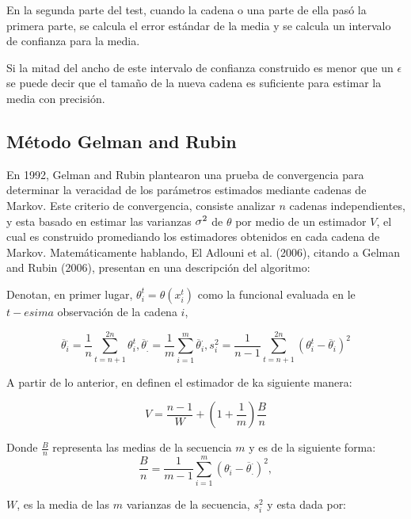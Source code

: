 En la segunda parte del test, cuando la cadena o una parte de ella pasó la primera parte, se calcula el error estándar de la media y se calcula un intervalo de confianza para la media. 

Si la mitad del ancho de este intervalo de confianza construido es menor que un $\epsilon$ se puede decir que el tamaño de la nueva cadena es suficiente para estimar la media con precisión. \cite{romo}

\subsection{Método Gelman and Rubin}

En 1992, Gelman and Rubin plantearon una prueba de convergencia para determinar la veracidad de los parámetros estimados mediante cadenas de Markov. Este criterio de convergencia, consiste analizar $n$ cadenas independientes, 
y esta basado en estimar las varianzas $\sigma ^2 $ de $\theta$ por medio de un estimador $V$, el cual es construido promediando los estimadores obtenidos en cada cadena de Markov. Matemáticamente hablando, El Adlouni et al. (2006), citando a Gelman and Rubin (2006), presentan en \cite{adlouni} una descripción del algoritmo: 

Denotan, en primer lugar, $\theta_i^t=\theta(x_i^t)$ como la funcional evaluada en le $t-esima$ observación de la cadena $i$,

\begin{equation}
\overline{\theta}_i^{.}=\frac{1}{n}\sum_{t=n+1}^{2n} \theta_i^t , \overline{\theta}_{.}^{.}=\frac{1}{m} \sum_{i=1}^m \overline{\theta}_i^{.}, s_i^2=\frac{1}{n-1} \sum_{t=n+1}^{2n}(\theta_i^t-\overline{\theta}_i^{.})^2
\end{equation}

A partir de lo anterior, en \cite{adlouni} definen el estimador de ka siguiente manera: 

\begin{equation}
V=\frac{n-1}{W}+\left(1+\frac{1}{m}\right)\frac{B}{n}
\end{equation}

Donde $\frac{B}{n}$ representa las medias de la secuencia $m$ y es de la siguiente forma: 
\begin{equation}
\frac{B}{n}=\frac{1}{m-1}\sum_{i=1}^m(\theta_i^{.}-\overline{\theta}_{.}^{.})^2,
\end{equation}

$W$, es la media de las $m$ varianzas de la secuencia, $s_i^2$ y esta dada por: 


